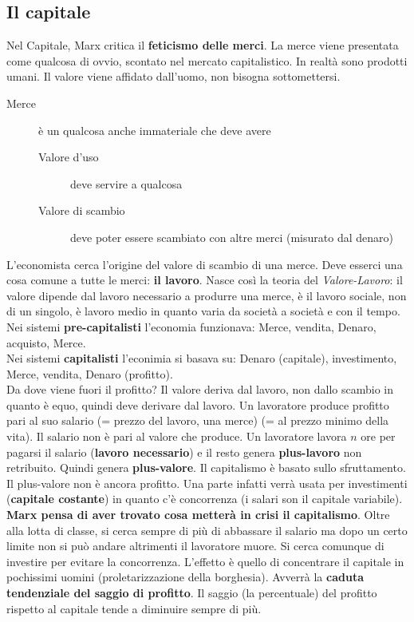 \subsection{Il capitale}
Nel Capitale, Marx critica il \textbf{feticismo delle merci}. La merce viene presentata come qualcosa
di ovvio, scontato nel mercato capitalistico. In realtà sono prodotti umani. Il valore viene affidato
dall'uomo, non bisogna sottomettersi.
\begin{description}
  \item[Merce] è un qualcosa anche immateriale che deve avere
    \begin{description}
      \item[Valore d'uso] deve servire a qualcosa
      \item[Valore di scambio] deve poter essere scambiato con altre merci (misurato dal denaro)
    \end{description}
\end{description}
L'economista cerca l'origine del valore di scambio di una merce. Deve esserci una cosa comune a
tutte le merci: \textbf{il lavoro}. Nasce così la teoria del \textit{Valore-Lavoro}: il valore
dipende dal lavoro necessario a produrre una merce, è il lavoro sociale, non di un singolo, è
lavoro medio in quanto varia da società a società e con il tempo.\\
Nei sistemi \textbf{pre-capitalisti} l'economia funzionava: Merce, vendita, Denaro, acquisto, 
Merce.\\
Nei sistemi \textbf{capitalisti} l'econimia si basava su: Denaro (capitale), investimento, Merce, 
vendita, Denaro (profitto).\\
Da dove viene fuori il profitto? Il valore deriva dal lavoro, non dallo scambio in quanto è equo,
quindi deve derivare dal lavoro. Un lavoratore produce profitto pari al suo salario (= prezzo del
lavoro, una merce) (= al prezzo minimo della vita). Il salario non è pari al valore che produce.
Un lavoratore lavora $n$ ore per pagarsi il salario (\textbf{lavoro necessario}) e il resto genera
\textbf{plus-lavoro} non retribuito. Quindi genera  \textbf{plus-valore}. Il capitalismo è basato
sullo sfruttamento. Il plus-valore non è ancora profitto. Una parte infatti verrà usata per
investimenti (\textbf{capitale costante}) in quanto c'è concorrenza (i salari son il capitale 
variabile).\\
\textbf{Marx pensa di aver trovato cosa metterà in crisi il capitalismo}. Oltre alla lotta di classe,
si cerca sempre di più di abbassare il salario ma dopo un certo limite non si può andare altrimenti
il lavoratore muore. Si cerca comunque di investire per evitare la concorrenza. L'effetto è quello
di concentrare il capitale in pochissimi uomini (proletarizzazione della borghesia). Avverrà la
\textbf{caduta tendenziale del saggio di profitto}. Il saggio (la percentuale) del profitto rispetto
al capitale tende a diminuire sempre di più.

